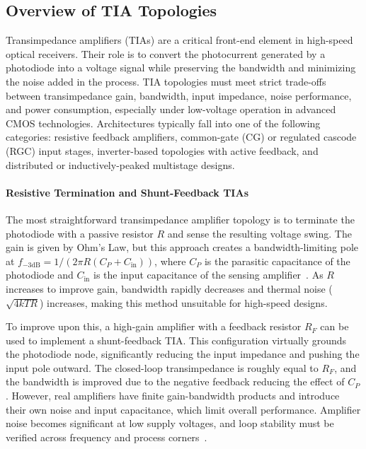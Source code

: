 \documentclass[11pt]{article}
\begin{document}
\subsection{Overview of TIA Topologies}

Transimpedance amplifiers (TIAs) are a critical front-end element in high-speed optical receivers. Their role is to convert the photocurrent generated by a photodiode into a voltage signal while preserving the bandwidth and minimizing the noise added in the process. TIA topologies must meet strict trade-offs between transimpedance gain, bandwidth, input impedance, noise performance, and power consumption, especially under low-voltage operation in advanced CMOS technologies. Architectures typically fall into one of the following categories: resistive feedback amplifiers, common-gate (CG) or regulated cascode (RGC) input stages, inverter-based topologies with active feedback, and distributed or inductively-peaked multistage designs.

\paragraph{Resistive Termination and Shunt-Feedback TIAs}

The most straightforward transimpedance amplifier topology is to terminate the photodiode with a passive resistor $R$ and sense the resulting voltage swing. The gain is given by Ohm's Law, but this approach creates a bandwidth-limiting pole at $f_{-3\text{dB}} = 1/(2\pi R(C_P + C_{\text{in}}))$, where $C_P$ is the parasitic capacitance of the photodiode and $C_{\text{in}}$ is the input capacitance of the sensing amplifier~\cite{compare}. As $R$ increases to improve gain, bandwidth rapidly decreases and thermal noise ($\sqrt{4kTR}$) increases, making this method unsuitable for high-speed designs.

To improve upon this, a high-gain amplifier with a feedback resistor $R_F$ can be used to implement a shunt-feedback TIA. This configuration virtually grounds the photodiode node, significantly reducing the input impedance and pushing the input pole outward. The closed-loop transimpedance is roughly equal to $R_F$, and the bandwidth is improved due to the negative feedback reducing the effect of $C_P$. However, real amplifiers have finite gain-bandwidth products and introduce their own noise and input capacitance, which limit overall performance. Amplifier noise becomes significant at low supply voltages, and loop stability must be verified across frequency and process corners~\cite{compare}.
\end{document}
